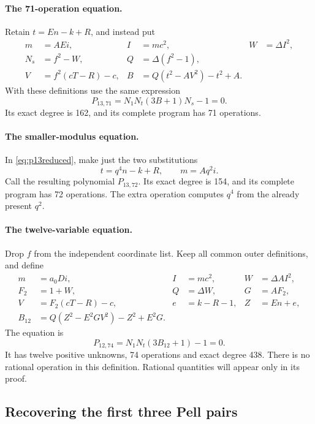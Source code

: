 \documentclass[11pt]{article}
\theoremstyle{remark}\newtheorem{remark}[theorem]{Remark}
\begin{document}
\paragraph{The 71-operation equation.}
Retain $t=En-k+R$, and instead put
\begin{align*}
 m&=AEi,& I&=mc^2,& W&=\Delta I^2,\\
 N_s&=f^2-W,& Q&=\Delta(f^2-1),\\
 V&=f^2(cT-R)-c,&B&=Q(t^2-AV^2)-t^2+A.
\end{align*}
With these definitions use the same expression
\begin{equation}\label{eq:p13reduced}
 \boxed{P_{13,71}=N_1N_t(3B+1)N_s-1=0.}
\end{equation}
Its exact degree is 162, and its complete program has 71 operations.

\paragraph{The smaller-modulus equation.}
In \eqref{eq:p13reduced}, make just the two substitutions
\begin{equation}\label{eq:smallmod}
 t=q^4n-k+R,\qquad m=Aq^2i.
\end{equation}
Call the resulting polynomial $P_{13,72}$. Its exact degree is 154,
and its complete program has 72 operations. The extra operation computes
$q^4$ from the already present $q^2$.

\paragraph{The twelve-variable equation.}
Drop $f$ from the independent coordinate list. Keep all common outer
definitions, and define
\begin{align*}
 m&=a_0Di,& I&=mc^2,&W&=\Delta A I^2,\\
 F_2&=1+W,&Q&=\Delta W,&G&=AF_2,\\
 V&=F_2(cT-R)-c,&e&=k-R-1,&Z&=En+e,\\
 B_{12}&=Q(Z^2-E^2GV^2)-Z^2+E^2G.
\end{align*}
The equation is
\begin{equation}\label{eq:p12}
 \boxed{P_{12,74}=N_1N_t(3B_{12}+1)-1=0.}
\end{equation}
It has twelve positive unknowns, 74 operations and exact degree 438.
There is no rational operation in this definition. Rational quantities
will appear only in its proof.

\subsection{Recovering the first three Pell pairs}
\end{document}
